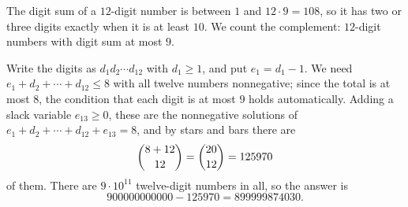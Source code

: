 The digit sum of a $12$-digit number is between $1$ and $12\cdot9=108$, so it has two or three digits exactly when it is at least $10$. We count the complement: $12$-digit numbers with digit sum at most $9$.

Write the digits as $d_1d_2\cdots d_{12}$ with $d_1\ge1$, and put $e_1=d_1-1$. We need $e_1+d_2+\cdots+d_{12}\le8$ with all twelve numbers nonnegative; since the total is at most $8$, the condition that each digit is at most $9$ holds automatically. Adding a slack variable $e_{13}\ge0$, these are the nonnegative solutions of $e_1+d_2+\cdots+d_{12}+e_{13}=8$, and by stars and bars there are
\[
\dbinom{8+12}{12}=\dbinom{20}{12}=125970
\]
of them. There are $9\cdot10^{11}$ twelve-digit numbers in all, so the answer is
\[
900000000000-125970=\boxed{899999874030}.
\]
